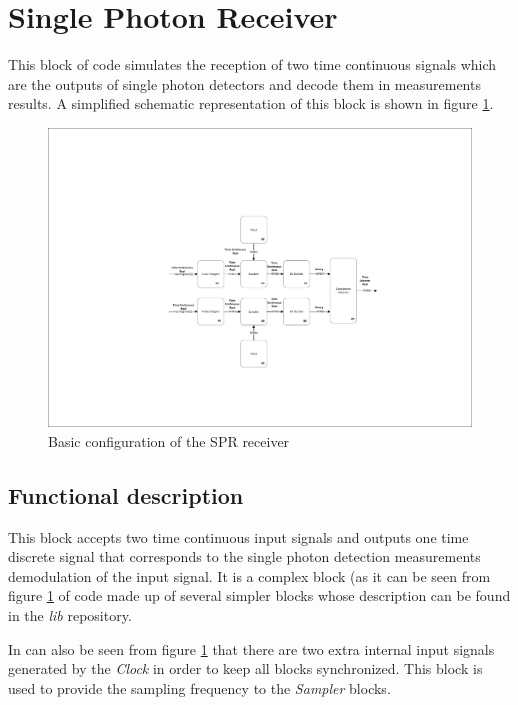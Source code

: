 \clearpage

\section{Single Photon Receiver}

This block of code simulates the reception of two time continuous signals which are the outputs of single photon detectors and decode them in measurements results. A simplified schematic representation of this block is shown in figure \ref{SPR_receiver_block_diagram_simple}.

\begin{figure}[h]
	\centering
	\includegraphics[clip, trim=8cm 4cm 6cm 5cm, width=1.00\textwidth]{./lib/single_photon_receiver/figures/single_photon_receiver.pdf}
	\caption{Basic configuration of the SPR receiver}\label{SPR_receiver_block_diagram_simple}
\end{figure}

\subsection*{Functional description}

This block accepts two time continuous input signals and outputs one time discrete signal that corresponds to the single photon detection measurements demodulation of the input signal. It is a complex block (as it can be seen from figure \ref{SPR_receiver_block_diagram_simple} of code made up of several simpler blocks whose description can be found in the \textit{lib} repository.

In can also be seen from figure \ref{SPR_receiver_block_diagram_simple} that there are two extra internal input signals generated by the \textit{Clock} in order to keep all blocks synchronized. This block is used to provide the sampling frequency to the \textit{Sampler} blocks.


